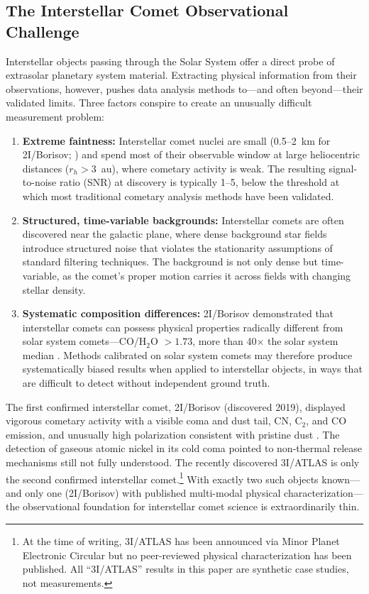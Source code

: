 \documentclass[preprint2]{aastex631}
\begin{document}
\subsection{The Interstellar Comet Observational Challenge}

Interstellar objects passing through the Solar System offer a direct probe of extrasolar planetary system material. Extracting physical information from their observations, however, pushes data analysis methods to---and often beyond---their validated limits. Three factors conspire to create an unusually difficult measurement problem:

\begin{enumerate}
    \item \textbf{Extreme faintness:} Interstellar comet nuclei are small (0.5--2~km for 2I/Borisov; \citealt{jewitt20}) and spend most of their observable window at large heliocentric distances ($r_h > 3$~au), where cometary activity is weak. The resulting signal-to-noise ratio (SNR) at discovery is typically 1--5, below the threshold at which most traditional cometary analysis methods have been validated.
    \item \textbf{Structured, time-variable backgrounds:} Interstellar comets are often discovered near the galactic plane, where dense background star fields introduce structured noise that violates the stationarity assumptions of standard filtering techniques. The background is not only dense but time-variable, as the comet's proper motion carries it across fields with changing stellar density.
    \item \textbf{Systematic composition differences:} 2I/Borisov demonstrated that interstellar comets can possess physical properties radically different from solar system comets---CO/H$_2$O $> 1.73$, more than 40$\times$ the solar system median \citep{bodewits20,opitom21}. Methods calibrated on solar system comets may therefore produce systematically biased results when applied to interstellar objects, in ways that are difficult to detect without independent ground truth.
\end{enumerate}

The first confirmed interstellar comet, 2I/Borisov (discovered 2019), displayed vigorous cometary activity with a visible coma and dust tail, CN, C$_2$, and CO emission, and unusually high polarization consistent with pristine dust \citep{guzik19,jewitt19,fitzsimmons19,bodewits20,bagnulo22}. The detection of gaseous atomic nickel in its cold coma \citep{guzik21} pointed to non-thermal release mechanisms still not fully understood. The recently discovered 3I/ATLAS is only the second confirmed interstellar comet.\footnote{At the time of writing, 3I/ATLAS has been announced via Minor Planet Electronic Circular but no peer-reviewed physical characterization has been published. All ``3I/ATLAS'' results in this paper are synthetic case studies, not measurements.} With exactly two such objects known---and only one (2I/Borisov) with published multi-modal physical characterization---the observational foundation for interstellar comet science is extraordinarily thin.
\end{document}
